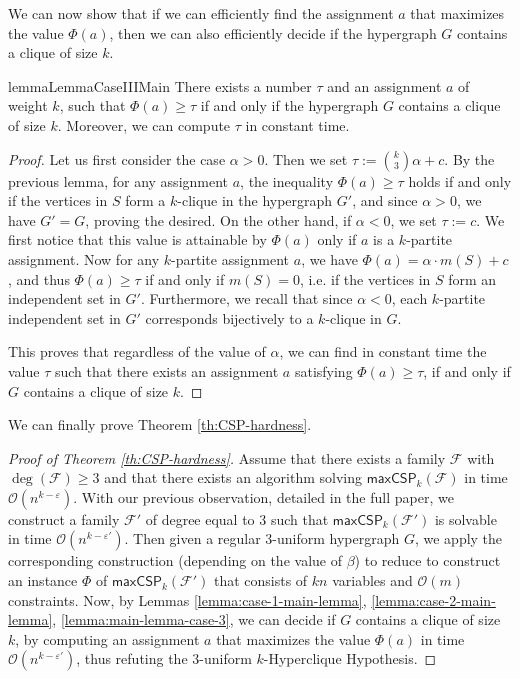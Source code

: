 \documentclass[a4paper,UKenglish,cleveref, autoref, thm-restate,numberwithinsect]{lipics-v2021}
\newcommand{\bigO}{\mathcal{O}}
\newcommand{\maxcspk}{\textsf{maxCSP}_{k}}
\newcommand{\Fam}{\mathcal{F}}
\begin{document}
We can now show that if we can efficiently find the assignment $a$ that maximizes the value $\Phi(a)$, then we can also efficiently decide if the hypergraph $G$ contains a clique of size $k$.
\begin{restatable}{lemma}{LemmaCaseIIIMain}\label{lemma:main-lemma-case-3}
    There exists a number $\tau$ and an assignment $a$ of weight $k$, such that $\Phi(a)\geq \tau$ if and only if the hypergraph $G$ contains a clique of size $k$. Moreover, we can compute $\tau$ in constant time.
\end{restatable}
\begin{proof}
    Let us first consider the case $\alpha>0$. Then we set $\tau:=\binom{k}{3}\alpha + c$.
    By the previous lemma, for any assignment $a$, the inequality $\Phi(a)\geq \tau$ holds if and only if the vertices in $S$ form a $k$-clique in the hypergraph $G'$, and since $\alpha>0$, we have $G'=G$, proving the desired.
    On the other hand, if $\alpha<0$, we set $\tau:=c$. We first notice that this value is attainable by $\Phi(a)$ only if $a$ is a $k$-partite assignment.
    Now for any $k$-partite assignment $a$, we have
    $\Phi(a) = \alpha\cdot m(S) + c$,
    and thus $\Phi(a)\geq \tau$ if and only if $m(S) = 0$, i.e. if the vertices in $S$ form an independent set in $G'$. 
    Furthermore, we recall that since $\alpha<0$, each $k$-partite independent set in $G'$ corresponds bijectively to a $k$-clique in $G$.
    
    This proves that regardless of the value of $\alpha$, we can find in constant time the value $\tau$ such that there exists an assignment $a$ satisfying $\Phi(a)\geq \tau$, if and only if $G$ contains a clique of size $k$.
\end{proof}

We can finally prove Theorem \ref{th:CSP-hardness}.
\begin{proof}[Proof of Theorem \ref{th:CSP-hardness}]
    Assume that there exists a family $\Fam$ with $\deg(\Fam)\geq 3$ and that there exists an algorithm solving $\maxcspk(\Fam)$ in time $\bigO(n^{k-\varepsilon})$. 
    With our previous observation, detailed in the full paper, we construct a family $\Fam'$ of degree equal to $3$ such that $\maxcspk(\Fam')$ is solvable in time $\bigO(n^{k-\varepsilon'})$.
    Then given a regular $3$-uniform hypergraph $G$, we apply the corresponding construction (depending on the value of $\beta$) to reduce to construct an instance $\Phi$ of $\maxcspk(\Fam')$ that consists of $kn$ variables and $\bigO(m)$ constraints.
    Now, by Lemmas \ref{lemma:case-1-main-lemma}, \ref{lemma:case-2-main-lemma}, \ref{lemma:main-lemma-case-3}, we can decide if $G$ contains a clique of size $k$, by computing an assignment $a$ that maximizes the value $\Phi(a)$ in time $\bigO(n^{k-\varepsilon'})$, thus refuting the $3$-uniform $k$-Hyperclique Hypothesis.
\end{proof}
\end{document}
